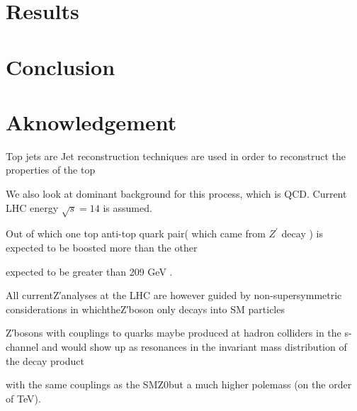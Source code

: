 \documentclass[12pt,a4paper]{article}		%
\begin{document}
\section{Results}
\newpage
\section{Conclusion}
\newpage
\section{Aknowledgement}	 
	\newpage 

   Top jets are Jet reconstruction techniques are used in order to reconstruct the properties of the top     

We also look at dominant background for this process, which is QCD.  Current LHC energy $\sqrt{s} = 14$ is assumed. 


Out of which one top anti-top quark pair( which came from $Z^\prime$ decay ) is expected to be boosted more than the other  


 
expected to be greater than 209 GeV .


  All currentZ′analyses at the LHC are however guided by non-supersymmetric considerations in whichtheZ′boson only decays into SM particles  

Z′bosons with couplings to quarks maybe produced at hadron colliders in the s-channel and would show up as resonances in the invariant mass distribution of the decay product
 

with  the  same  couplings  as  the  SMZ0but a much higher polemass (on the order of TeV).     
\end{document}
